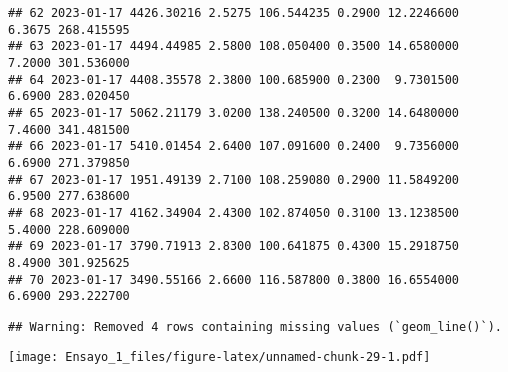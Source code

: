 \documentclass[
]{article}
\newenvironment{Shaded}{\begin{snugshade}}{\end{snugshade}}
\newcommand{\AttributeTok}[1]{\textcolor[rgb]{0.77,0.63,0.00}{#1}}
\newcommand{\FunctionTok}[1]{\textcolor[rgb]{0.00,0.00,0.00}{#1}}
\newcommand{\NormalTok}[1]{#1}
\newcommand{\OtherTok}[1]{\textcolor[rgb]{0.56,0.35,0.01}{#1}}
\newcommand{\SpecialCharTok}[1]{\textcolor[rgb]{0.00,0.00,0.00}{#1}}
\newcommand{\StringTok}[1]{\textcolor[rgb]{0.31,0.60,0.02}{#1}}
\begin{document}
\begin{verbatim}
## 62 2023-01-17 4426.30216 2.5275 106.544235 0.2900 12.2246600  6.3675 268.415595
## 63 2023-01-17 4494.44985 2.5800 108.050400 0.3500 14.6580000  7.2000 301.536000
## 64 2023-01-17 4408.35578 2.3800 100.685900 0.2300  9.7301500  6.6900 283.020450
## 65 2023-01-17 5062.21179 3.0200 138.240500 0.3200 14.6480000  7.4600 341.481500
## 66 2023-01-17 5410.01454 2.6400 107.091600 0.2400  9.7356000  6.6900 271.379850
## 67 2023-01-17 1951.49139 2.7100 108.259080 0.2900 11.5849200  6.9500 277.638600
## 68 2023-01-17 4162.34904 2.4300 102.874050 0.3100 13.1238500  5.4000 228.609000
## 69 2023-01-17 3790.71913 2.8300 100.641875 0.4300 15.2918750  8.4900 301.925625
## 70 2023-01-17 3490.55166 2.6600 116.587800 0.3800 16.6554000  6.6900 293.222700
\end{verbatim}

\begin{Shaded}
\end{Shaded}

\begin{verbatim}
## Warning: Removed 4 rows containing missing values (`geom_line()`).
\end{verbatim}

\texttt{[image: Ensayo\_1\_files/figure-latex/unnamed-chunk-29-1.pdf]}
\end{document}
